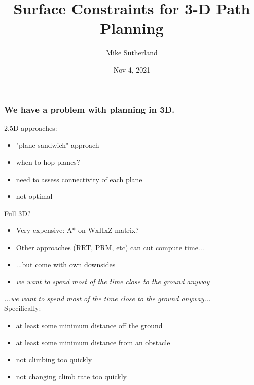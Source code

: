 \documentclass[10pt]{beamer}
\begin{document}
	\author{Mike Sutherland}
	\title{Surface Constraints for 3-D Path Planning}
	\date{Nov 4, 2021}
	\begin{frame}[plain]
		\maketitle
	\end{frame}
	
	\begin{frame}
		\frametitle{We have a problem with planning in 3D.}
		\par 2.5D approaches: 
		\begin{itemize}
			\item "plane sandwich" approach
			\item when to hop planes?
			\item need to assess connectivity of each plane
			\item not optimal
		\end{itemize}
		\par Full 3D?
		\begin{itemize}
			\item Very expensive: A* on WxHxZ matrix?
			\item Other approaches (RRT, PRM, etc) can cut compute time... 
			\item ...but come with own downsides
			\item \textit{we want to spend most of the time close to the ground anyway}
		\end{itemize}
	\end{frame}

	\begin{frame}
		\textit{...we want to spend most of the time close to the ground anyway...} \\
		\bigskip
		Specifically:
		\bigskip
		\begin{itemize}
			\item at least some minimum distance off the ground
			\item at least some minimum distance from an obstacle
			\item not climbing too quickly
			\item not changing climb rate too quickly
		\end{itemize}
	\end{frame}
\end{document}
